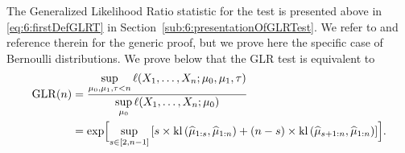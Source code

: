 The Generalized Likelihood Ratio statistic for the test is presented above in \eqref{eq:6:firstDefGLRT} in Section~\ref{sub:6:presentationOfGLRTest}.
%
We refer to \cite{Basseville93} and reference therein for the generic proof, but we prove here the specific case of Bernoulli distributions.
%
We prove below that the GLR test is equivalent to
\begin{align*}
    \mathrm{GLR}(n)
    &= \frac{\sup\limits_{\mu_0,\mu_1,\tau < n}\ell(X_1, \ldots, X_n ; \mu_0,\mu_1,\tau)}{\sup\limits_{\mu_0}\ell(X_1, \ldots, X_n ; \mu_0)} \\
    &= \exp\Bigl[ \sup_{s \in [2,n-1]} \left[s \times \mathrm{kl}\left(\widehat{\mu}_{1:s},\widehat{\mu}_{1:n}\right) + (n-s) \times \mathrm{kl}\left(\widehat{\mu}_{s+1:n},\widehat{\mu}_{1:n}\right)\right] \Bigr].
\end{align*}
%

